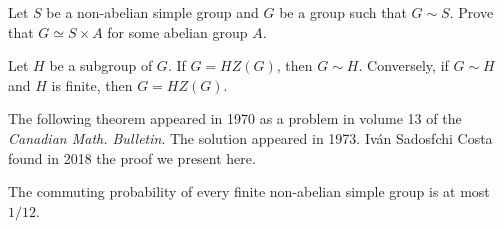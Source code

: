\begin{exercise}
\label{xca:isoclinism_simple}
    Let $S$ be a non-abelian simple group and
    $G$ be a group such that $G\sim S$. Prove that 
    $G\simeq S\times A$ for some abelian group $A$.
\end{exercise}

\begin{exercise}
\label{xca:isoclinism_factorization}
    Let $H$ be a subgroup of $G$. If $G=HZ(G)$, then $G\sim H$. 
    Conversely, if $G\sim H$ and $H$ is finite, then 
    $G=HZ(G)$. 
\end{exercise}

The following theorem appeared in 1970 as a problem in 
volume 13 of the \textit{Canadian Math. Bulletin}. The solution
appeared in 1973. 
Iv\'an Sadosfchi Costa found in 2018 
the proof we present here. 

\begin{theorem}[Dixon]
    \label{thm:Dixon}
    The commuting probability of every finite 
    non-abelian simple group is at most $1/12$. 
\end{theorem}

